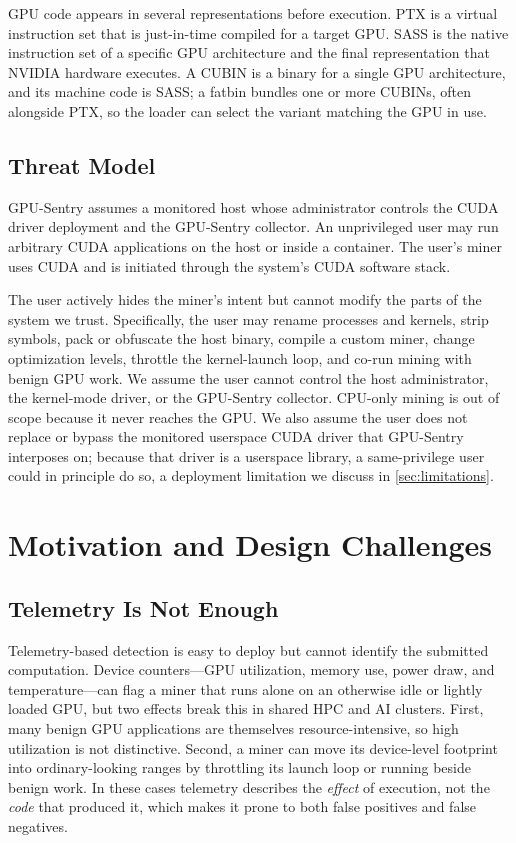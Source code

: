 GPU code appears in several representations before execution. PTX is a virtual instruction set that is just-in-time compiled for a target GPU. SASS is the native instruction set of a specific GPU architecture and the final representation that NVIDIA hardware executes. A CUBIN is a binary for a single GPU architecture, and its machine code is SASS; a fatbin bundles one or more CUBINs, often alongside PTX, so the loader can select the variant matching the GPU in use.

\subsection{Threat Model}

GPU-Sentry assumes a monitored host whose administrator controls the CUDA driver deployment and the GPU-Sentry collector. An unprivileged user may run arbitrary CUDA applications on the host or inside a container. The user's miner uses CUDA and is initiated through the system's CUDA software stack.

The user actively hides the miner's intent but cannot modify the parts of the system we trust. Specifically, the user may rename processes and kernels, strip symbols, pack or obfuscate the host binary, compile a custom miner, change optimization levels, throttle the kernel-launch loop, and co-run mining with benign GPU work. We assume the user cannot control the host administrator, the kernel-mode driver, or the GPU-Sentry collector. CPU-only mining is out of scope because it never reaches the GPU. We also assume the user does not replace or bypass the monitored userspace CUDA driver that GPU-Sentry interposes on; because that driver is a userspace library, a same-privilege user could in principle do so, a deployment limitation we discuss in \cref{sec:limitations}.

\section{Motivation and Design Challenges}
\label{sec:motivation}

\subsection{Telemetry Is Not Enough}

Telemetry-based detection is easy to deploy but cannot identify the submitted computation. Device counters---GPU utilization, memory use, power draw, and temperature---can flag a miner that runs alone on an otherwise idle or lightly loaded GPU, but two effects break this in shared HPC and AI clusters. First, many benign GPU applications are themselves resource-intensive, so high utilization is not distinctive. Second, a miner can move its device-level footprint into ordinary-looking ranges by throttling its launch loop or running beside benign work. In these cases telemetry describes the \emph{effect} of execution, not the \emph{code} that produced it, which makes it prone to both false positives and false negatives.

